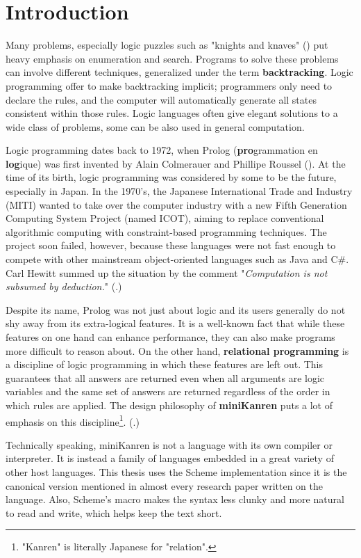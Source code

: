 \section{Introduction}
Many problems, especially logic puzzles such as "knights and knaves" (\cite{knight}) put heavy emphasis on enumeration and search. Programs to solve these problems can involve different techniques, generalized under the term \textbf{backtracking}. Logic programming offer to make backtracking implicit; programmers only need to declare the rules, and the computer will automatically generate all states consistent within those rules. Logic languages often give elegant solutions to a wide class of problems, some can be also used in general computation.

Logic programming dates back to 1972, when Prolog (\textbf{pro}grammation en \textbf{log}ique) was first invented by Alain Colmerauer and Phillipe Roussel (\cite{early-prolog}). At the time of its birth, logic programming was considered by some to be the future, especially in Japan. In the 1970's, the Japanese International Trade and Industry (MITI) wanted to take over the computer industry with a new Fifth Generation Computing System Project (named ICOT), aiming to replace conventional algorithmic computing with constraint-based programming techniques. The project soon failed, however, because these languages were not fast enough to compete with other mainstream object-oriented languages such as Java and C\#. Carl Hewitt summed up the situation by the comment "\textit{Computation is not subsumed by deduction.}" (\cite{logic-fail}.)

Despite its name, Prolog was not just about logic and its users generally do not shy away from its extra-logical features. It is a well-known fact that while these features on one hand can enhance performance, they can also make programs more difficult to reason about. On the other hand, \textbf{relational programming} is a discipline of logic programming in which these features are left out. This guarantees that all answers are returned even when all arguments are logic variables and the same set of answers are returned regardless of the order in which rules are applied. The design philosophy of \textbf{miniKanren} puts a lot of emphasis on this discipline\footnote{"Kanren" is literally Japanese for "relation".}. (\cite{byrdphd}.)

Technically speaking, miniKanren is not a language with its own compiler or interpreter. It is instead a family of languages embedded in a great variety of other host languages. This thesis uses the Scheme implementation since it is the canonical version mentioned in almost every research paper written on the language. Also, Scheme's macro makes the syntax less clunky and more natural to read and write, which helps keep the text short.

